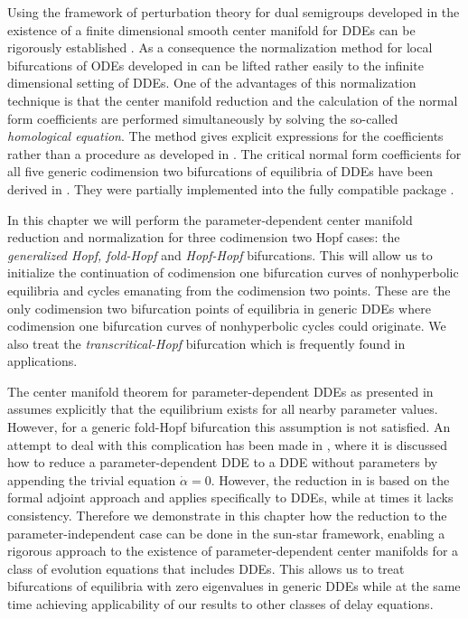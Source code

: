 Using the framework of perturbation theory for dual semigroups developed in \cite{Clement1987, Clement1988, Clement1989, Clement1989b} the existence of a finite dimensional smooth center manifold for DDEs can be rigorously established \cite{diekmann1995delay}. As a consequence the normalization method for local bifurcations of ODEs developed in \cite{Kuznetsov1999} can be lifted \cite{Janssens:Thesis} rather easily to the infinite dimensional setting of DDEs. One of the advantages of this normalization technique is that the center manifold reduction and the calculation of the normal form coefficients are performed simultaneously by solving the so-called \emph{homological equation}. The method gives explicit expressions for the coefficients rather than a procedure as developed in \cite{Faria1995201, Faria1995}. The critical normal form coefficients for all five generic codimension two bifurcations of equilibria of DDEs have been derived in \cite{Janssens:Thesis}. They were partially implemented into the fully \OCTAVE compatible \MATLAB package \DDEBIFTOOL \cite{DDEBIFTOOL,2014arXiv1406.7144S,Wage:Thesis:2014}. 

In this chapter we will perform the parameter-dependent center manifold reduction and normalization for three codimension two Hopf cases: the \emph{generalized Hopf, fold-Hopf} and \emph{Hopf-Hopf} bifurcations. This will allow us to initialize the continuation of codimension one bifurcation curves of nonhyperbolic equilibria and cycles emanating from the codimension two points. These are the only codimension two bifurcation points of equilibria in generic DDEs where codimension one bifurcation curves of nonhyperbolic cycles could originate. We also treat the \emph{transcritical-Hopf} bifurcation which is frequently found in applications.

The center manifold theorem for parameter-dependent DDEs as presented in \cite{diekmann1995delay} assumes explicitly that the equilibrium exists for all nearby parameter values. However, for a generic fold-Hopf bifurcation this assumption is not satisfied. An attempt to deal with this complication has been made in \cite{GuoMan2011parCM}, where it is discussed how to reduce a parameter-dependent DDE to a DDE without parameters by appending the trivial equation $\dot{\alpha}=0$. However, the reduction in \cite{GuoMan2011parCM} is based on the formal adjoint approach \cite{hale1969functional} and applies specifically to DDEs, while at times it lacks consistency. Therefore we demonstrate in this chapter how the reduction to the parameter-independent case can be done in the sun-star framework, enabling a rigorous approach to the existence of parameter-dependent center manifolds for a class of evolution equations that includes DDEs. This allows us to treat bifurcations of equilibria with zero eigenvalues in generic DDEs while at the same time achieving applicability of our results to other classes of delay equations.

